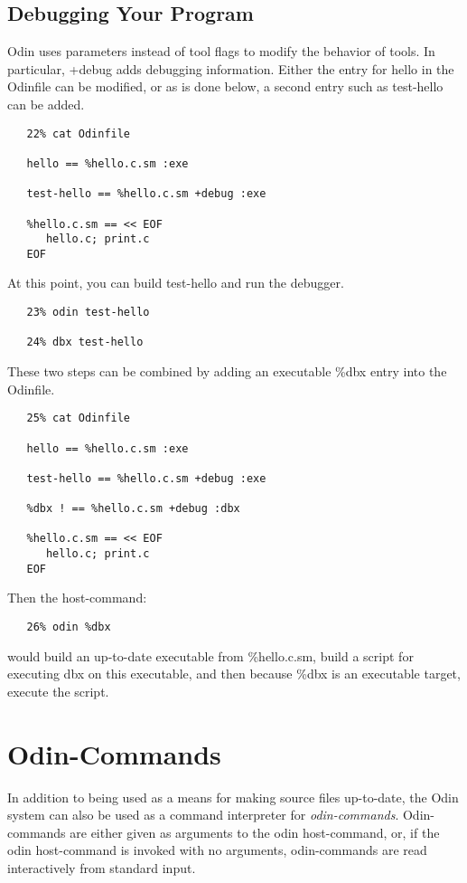 \section{Debugging Your Program}

Odin uses parameters instead of tool flags to modify the behavior of tools.
In particular, {\ex +debug} adds debugging information.
Either the entry for {\ex hello} in the {\ex Odinfile} can be modified,
or as is done below, a second entry such as {\ex test-hello} can be added.
\begin{verbatim}
   22% cat Odinfile

   hello == %hello.c.sm :exe

   test-hello == %hello.c.sm +debug :exe

   %hello.c.sm == << EOF
      hello.c; print.c
   EOF
\end{verbatim}
At this point, you can build {\ex test-hello} and run the debugger.
\begin{verbatim}
   23% odin test-hello

   24% dbx test-hello
\end{verbatim}
These two steps can be combined by adding an executable {\ex \%dbx} entry
into the {\ex Odinfile}.
\begin{verbatim}
   25% cat Odinfile

   hello == %hello.c.sm :exe

   test-hello == %hello.c.sm +debug :exe

   %dbx ! == %hello.c.sm +debug :dbx

   %hello.c.sm == << EOF
      hello.c; print.c
   EOF
\end{verbatim}
Then the host-command:
\begin{verbatim}
   26% odin %dbx
\end{verbatim}
would build an up-to-date executable from {\ex \%hello.c.sm},
build a script for executing dbx on this executable,
and then because {\ex \%dbx} is an executable target, execute the script.


\chapter{Odin-Commands}
\label{command}


In addition to being used as a means for making source files up-to-date,
the Odin system can also be used as a command interpreter for
{\em odin-commands}.
Odin-commands are either given as arguments to the {\ex odin} host-command,
or, if the {\ex odin} host-command is invoked with no arguments, 
odin-commands are read interactively from standard input.

